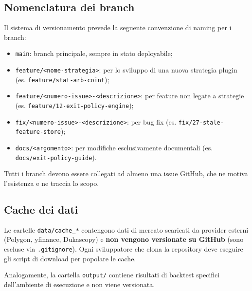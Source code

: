 \subsection{Nomenclatura dei branch}

Il sistema di versionamento prevede la seguente convenzione di naming per i branch:

\begin{itemize}
  \item \texttt{main}: branch principale, sempre in stato deployabile;
  \item \texttt{feature/<nome-strategia>}: per lo sviluppo di una nuova strategia plugin (es. \texttt{feature/stat-arb-coint});
  \item \texttt{feature/<numero-issue>-<descrizione>}: per feature non legate a strategie (es. \texttt{feature/12-exit-policy-engine});
  \item \texttt{fix/<numero-issue>-<descrizione>}: per bug fix (es. \texttt{fix/27-stale-feature-store});
  \item \texttt{docs/<argomento>}: per modifiche esclusivamente documentali (es. \texttt{docs/exit-policy-guide}).
\end{itemize}

Tutti i branch devono essere collegati ad almeno una issue GitHub, che ne motiva l'esistenza e ne traccia lo scopo.

\subsection{Cache dei dati}

Le cartelle \texttt{data/cache\_*} contengono dati di mercato scaricati da provider esterni (Polygon, yfinance, Dukascopy) e \textbf{non vengono versionate su GitHub} (sono escluse via \texttt{.gitignore}). Ogni sviluppatore che clona la repository deve eseguire gli script di download per popolare le cache.

Analogamente, la cartella \texttt{output/} contiene risultati di backtest specifici dell'ambiente di esecuzione e non viene versionata.
